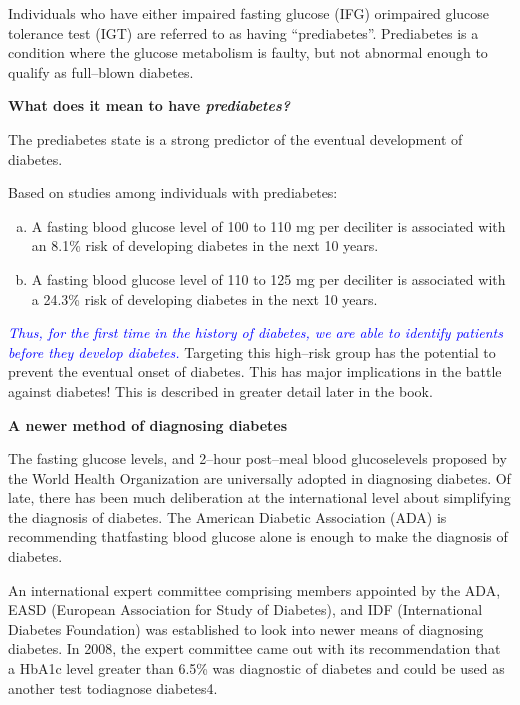 Individuals who have either impaired fasting glucose (IFG) or\break impaired glucose tolerance test (IGT) are referred to as having “prediabetes”. Prediabetes is a condition where the glucose metabolism is faulty, but not abnormal enough to qualify as full–blown diabetes.

\noindent
\textbf{What does it mean to have \textit{prediabetes?}}

The prediabetes state is a strong predictor of the eventual deve\-lopment of diabetes.

Based on studies among individuals with prediabetes:

\begin{enumerate}[a)]
\itemsep=0pt
\item A fasting blood glucose level of 100 to 110 mg per deciliter is asso\-ciated with an 8.1\% risk of developing diabetes in the next 10 years.
 \item A fasting blood glucose level of 110 to 125 mg per deciliter is associated with a 24.3\% risk of developing diabetes in the next 10 years.
 \end{enumerate}

\textcolor{blue}{\textit{Thus, for the first time in the history of diabetes, we are able to identify patients before they develop diabetes.}} Targeting this high–risk group has the potential to prevent the eventual onset of diabetes. This has major implications in the battle against diabetes! This is described in greater detail later in the book.

\noindent
\textbf{A newer method of diagnosing diabetes}

The fasting glucose levels, and 2–hour post–meal blood glucose\break levels proposed by the World Health Organization are universally ado\-pted in diagnosing diabetes. Of late, there has been much deliberation at the international level about simplifying the diagnosis of diabetes. The American Diabetic Association (ADA) is recommending that\break fasting blood glucose alone is enough to make the diagnosis of diabetes.

\clearpage

An international expert committee comprising members appoin\-ted by the ADA, EASD (European Association for Study of Diabetes), and IDF (International Diabetes Foundation) was established to look into newer means of diagnosing diabetes. In 2008, the expert commi\-ttee came out with its recommendation that a HbA1c level greater than 6.5\% was diagnostic of diabetes and could be used as another test to\break diagnose diabetes4.

